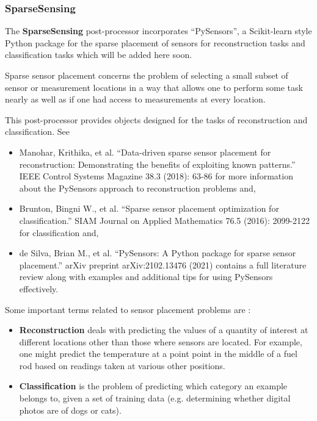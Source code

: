 \subsubsection{SparseSensing}
\label{SparseSensing}
The \textbf{SparseSensing} post-processor incorporates ``PySensors'', a Scikit-learn style Python package for the sparse placement of sensors for reconstruction tasks and classification tasks which will be added here soon.

Sparse sensor placement concerns the problem of selecting a small subset of sensor or measurement locations in a way that allows one to perform some task nearly as well as if one had access to measurements at every location.

This post-processor provides objects designed for the tasks of reconstruction and classification. See

\begin{itemize}
    \item Manohar, Krithika, et al. ``Data-driven sparse sensor placement for reconstruction: Demonstrating the benefits of exploiting known patterns.'' IEEE Control Systems Magazine 38.3 (2018): 63-86 for more information about the PySensors approach to reconstruction problems and,
    \item Brunton, Bingni W., et al. ``Sparse sensor placement optimization for classification.'' SIAM Journal on Applied Mathematics 76.5 (2016): 2099-2122 for classification and,
    \item de Silva, Brian M., et al. ``PySensors: A Python package for sparse sensor placement.'' arXiv preprint arXiv:2102.13476 (2021) contains a full literature review along with examples and additional tips for using PySensors effectively.
\end{itemize}

Some important terms related to sensor placement problems are :

\begin{itemize}
    \item \textbf{Reconstruction} deals with predicting the values of a quantity of interest at different locations other than those where sensors are located. For example, one might predict the temperature at a point point in the middle of a fuel rod based on readings taken at various other positions.

    \item \textbf{Classification} is the problem of predicting which category an example belongs to, given a set of training data (e.g. determining whether digital photos are of dogs or cats).
\end{itemize}

